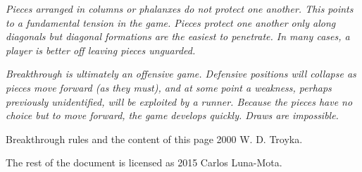 \documentclass[a4paper,12pt]{article}
\begin{document}
    \emph{Pieces arranged in columns or phalanxes do not protect one another.  This
        points to a fundamental tension in the game.  Pieces protect one another
        only along diagonals but diagonal formations are the easiest to penetrate.
        In many cases, a player is better off leaving pieces unguarded.}

    \emph{Breakthrough is ultimately an offensive game.  Defensive positions will
        collapse as pieces move forward (as they must), and at some point a
        weakness, perhaps previously unidentified, will be exploited by a runner.
        Because the pieces have no choice but to move forward, the game develops
        quickly.  Draws are impossible.}

    \vspace{5em}

    \begin{center}
        Breakthrough rules and the content of this page \raisebox{1pt}{{\sffamily\textcopyright}} 2000 W. D. Troyka.

        The rest of the document is licensed as \hspace{-0.35em}\raisebox{2pt}{\cc\hspace{-1em}\ccby}\hspace{-0.65em} 2015 Carlos Luna-Mota.
    \end{center}

\end{document}
